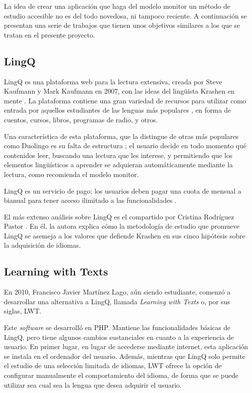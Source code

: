 La idea de crear una aplicación que haga del modelo monitor un método de estudio accesible no es del todo novedosa, ni tampoco reciente. A continuación se presentan una serie de trabajos que tienen unos objetivos similares a los que se tratan en el presente proyecto.

\subsection{LingQ}

LingQ es una plataforma web para la lectura extensiva, creada por Steve Kaufmann y Mark Kaufmann en 2007, con las ideas del lingüista Krashen en mente \autocite{LingQ}. La plataforma contiene una gran variedad de recursos para utilizar como entrada por aquellos estudiantes de las lenguas más populares \autocite{clara2025}, en forma de cuentos, cursos, libros, programas de radio, y otros.


Una característica de esta plataforma, que la distingue de otras más populares como Duolingo es su falta de estructura \autocite{Karasimos}; el usuario decide en todo momento qué contenidos leer, buscando una lectura que les interese, y permitiendo que los elementos lingüísticos a aprender se adquieran automáticamente mediante la lectura, como recomienda el modelo monitor.

LingQ es un servicio de pago; los usuarios deben pagar una cuota de mensual a bianual para tener acceso ilimitado a las funcionalidades \autocite{kabbasovna}.

El más extenso análisis sobre LingQ es el compartido por Cristina Rodríguez Pastor \autocite{Pastor_2022}. En él, la autora explica cómo la metodología de estudio que promueve LingQ se asemeja a los valores que defiende Krashen en sus cinco hipótesis sobre la adquisición de idiomas.

\subsection{Learning with Texts}

En 2010, Francisco Javier Martínez Lago, aún siendo estudiante, comenzó a desarrollar una alternativa a LingQ, llamada \textit{Learning with Texts} o, por sus siglas, LWT. \autocite{LWT}

Este \textit{software} se desarrolló en PHP. Mantiene las funcionalidades básicas de LingQ, pero tiene algunos cambios sustanciales en cuanto a la experiencia de usuario. En primer lugar, en lugar de accederse mediante internet, esta aplicación se instala en el ordenador del usuario. Además, mientras que LingQ solo permite el estudio de una selección limitada de idiomas, LWT ofrece la opción de configurar manualmente el comportamiento del idioma, de forma que se puede utilizar sea cual sea la lengua que desea adquirir el usuario.

